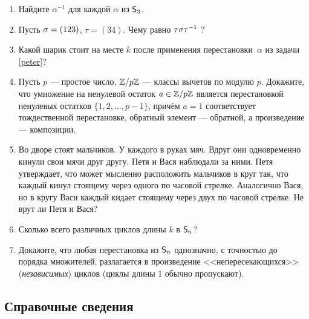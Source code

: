 \begin{enumerate}
\item Найдите $\alpha^{-1}$ для каждой $\alpha$ из ${\mathsf{S}}_3$.

\item Пусть $\sigma = (123)$, $\tau = (34)$. Чему равно $\tau\sigma\tau^{-1}$ ?


\item Какой шарик стоит на месте $k$ после применения перестановки~$\alpha$ из задачи \ref{peter}?

\item Пусть $p$ --- простое число, $\mathbb Z/p\mathbb Z$ --- классы вычетов по модулю $p$. Докажите, что
умножение на ненулевой остаток $a\in \mathbb Z/p\mathbb Z$ является перестановкой ненулевых остатков $\{1,2,\ldots,p-1\}$, причём $a=1$ соответствует тождественной перестановке, обратный элемент --- обратной, а произведение --- композиции.


\item \label{balls} Во дворе стоят   мальчиков. У каждого в руках мяч. Вдруг они одновременно кинули свои мячи друг другу. Петя и Вася наблюдали за ними. Петя утверждает, что может мысленно расположить мальчиков в круг так, что каждый кинул стоящему через одного по часовой стрелке. Аналогично Вася, но в кругу Васи каждый кидает стоящему через двух по часовой стрелке. Не врут ли Петя и Вася?

\item Сколько всего различных циклов длины $k$ в ${\mathsf{S}}_n$?


\item Докажите, что любая перестановка из ${\mathsf{S}}_n$ однозначно, с точностью до порядка множителей, разлагается в произведение <<непересекающихся>> ({\em независимых}) циклов (циклы длины 1 обычно пропускают).
\end{enumerate}

\subsection*{Справочные сведения}






